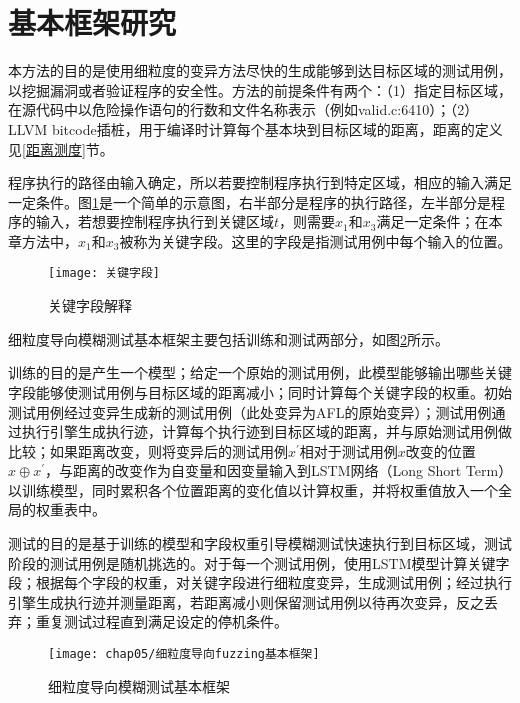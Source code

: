 \section{基本框架研究}

本方法的目的是使用细粒度的变异方法尽快的生成能够到达目标区域的测试用例，以挖掘漏洞或者验证程序的安全性。方法的前提条件有两个：（1）指定目标区域，在源代码中以危险操作语句的行数和文件名称表示（例如valid.c:6410）；（2）LLVM bitcode插桩，用于编译时计算每个基本块到目标区域的距离，距离的定义见\ref{距离测度}节。

程序执行的路径由输入确定，所以若要控制程序执行到特定区域，相应的输入满足一定条件。图\ref{关键字段}是一个简单的示意图，右半部分是程序的执行路径，左半部分是程序的输入，若想要控制程序执行到关键区域$t$，则需要$x_1$和$x_3$满足一定条件；在本章方法中，$x_1$和$x_3$被称为关键字段。这里的字段是指测试用例中每个输入的位置。

\begin{figure}[htb]
\begin{center}
\texttt{[image: 关键字段]}
\end{center}
\caption{关键字段解释}
\label{关键字段}
\end{figure}


细粒度导向模糊测试基本框架主要包括训练和测试两部分，如图\ref{细粒度导向fuzzing基本框架}所示。

训练的目的是产生一个模型；给定一个原始的测试用例，此模型能够输出哪些关键字段能够使测试用例与目标区域的距离减小；同时计算每个关键字段的权重。初始测试用例经过变异生成新的测试用例（此处变异为AFL的原始变异）；测试用例通过执行引擎生成执行迹，计算每个执行迹到目标区域的距离，并与原始测试用例做比较；如果距离改变，则将变异后的测试用例$x^{'}$相对于测试用例$x$改变的位置$x \oplus x^{'}$，与距离的改变作为自变量和因变量输入到LSTM网络（Long Short Term）以训练模型，同时累积各个位置距离的变化值以计算权重，并将权重值放入一个全局的权重表中。

测试的目的是基于训练的模型和字段权重引导模糊测试快速执行到目标区域，测试阶段的测试用例是随机挑选的。对于每一个测试用例，使用LSTM模型计算关键字段；根据每个字段的权重，对关键字段进行细粒度变异，生成测试用例；经过执行引擎生成执行迹并测量距离，若距离减小则保留测试用例以待再次变异，反之丢弃；重复测试过程直到满足设定的停机条件。

\begin{figure}[htb]
\begin{center}
\texttt{[image: chap05/细粒度导向fuzzing基本框架]}
\end{center}
\caption{细粒度导向模糊测试基本框架}
\label{细粒度导向fuzzing基本框架}
\end{figure}

